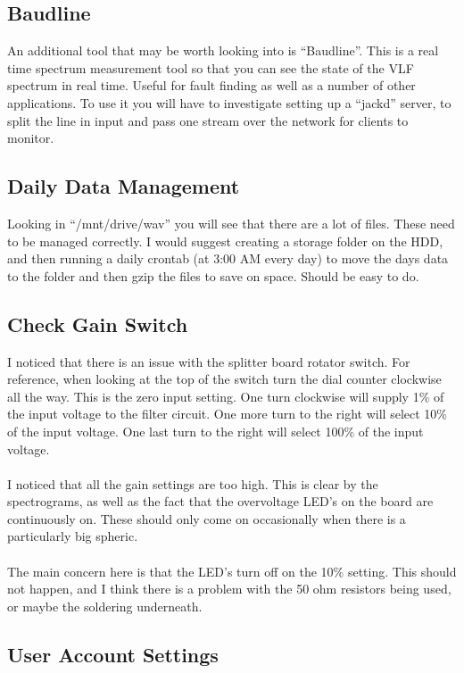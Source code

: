 \documentclass[a4paper,12pt]{article}
\begin{document}
\subsection{Baudline}

An additional tool that may be worth looking into is ``Baudline''. This is a real time spectrum measurement tool so that you can see the state of the VLF spectrum in real time. Useful for fault finding as well as a number of other applications. To use it you will have to investigate setting up a ``jackd'' server, to split the line in input and pass one stream over the network for clients to monitor.

\subsection{Daily Data Management}

Looking in ``/mnt/drive/wav'' you will see that there are a lot of files. These need to be managed correctly. I would suggest creating a storage folder on the HDD, and then running a daily crontab (at 3:00 AM every day) to move the days data to the folder and then gzip the files to save on space. Should be easy to do.

\subsection{Check Gain Switch}

I noticed that there is an issue with the splitter board rotator switch. For reference, when looking at the top of the switch turn the dial counter clockwise all the way. This is the zero input setting. One turn clockwise will supply 1\% of the input voltage to the filter circuit. One more turn to the right will select 10\% of the input voltage. One last turn to the right will select 100\% of the input voltage.\\
\\
I noticed that all the gain settings are too high. This is clear by the spectrograms, as well as the fact that the overvoltage LED's on the board are continuously on. These should only come on occasionally when there is a particularly big spheric.\\
\\
The main concern here is that the LED's turn off on the 10\% setting. This should not happen, and I think there is a problem with the 50 ohm resistors being used, or maybe the soldering underneath.

\subsection{User Account Settings}
\end{document}
